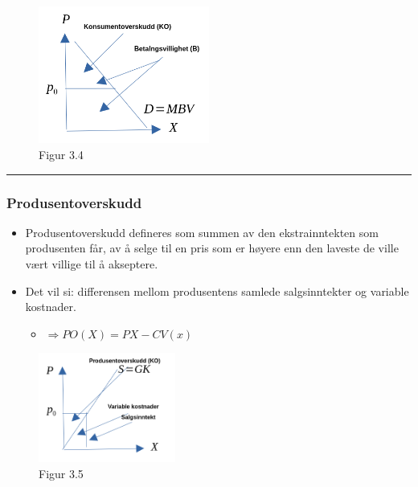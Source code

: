 \documentclass[
  letterpaper,
  DIV=11,
  numbers=noendperiod]{scrartcl}
\providecommand{\tightlist}{%
  \setlength{\itemsep}{0pt}\setlength{\parskip}{0pt}}\usepackage{longtable,booktabs,array}
\begin{document}
\begin{figure}[H]

{\centering \includegraphics[width=0.5\textwidth,height=\textheight]{drawio/konso.png}

}

\caption{Figur 3.4}

\end{figure}%

\begin{center}\rule{0.5\linewidth}{0.5pt}\end{center}

\subsubsection{Produsentoverskudd}\label{produsentoverskudd}

\begin{itemize}
\tightlist
\item
  Produsentoverskudd defineres som summen av den ekstrainntekten som
  produsenten får, av å selge til en pris som er høyere enn den laveste
  de ville vært villige til å akseptere.
\item
  Det vil si: differensen mellom produsentens samlede salgsinntekter og
  variable kostnader.

  \begin{itemize}
  \tightlist
  \item
    \(\Rightarrow PO(X) = PX-CV(x)\)
  \end{itemize}
\end{itemize}

\begin{figure}[H]

{\centering \includegraphics[width=0.4\textwidth,height=\textheight]{drawio/prodo.png}

}

\caption{Figur 3.5}

\end{figure}%
\end{document}
